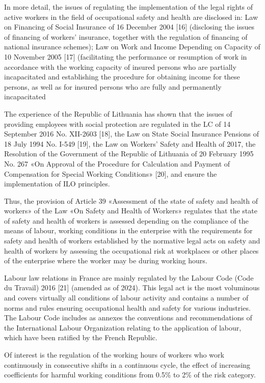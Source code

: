 In more detail, the issues of regulating the implementation of the legal
rights of active workers in the field of occupational safety and health
are disclosed in: Law on Financing of Social Insurance of 16 December
2004 {[}16{]} (disclosing the issues of financing of
workers'{} insurance, together with the regulation of
financing of national insurance schemes); Law on Work and Income
Depending on Capacity of 10 November 2005 {[}17{]} (facilitating the
performance or resumption of work in accordance with the working
capacity of insured persons who are partially incapacitated and
establishing the procedure for obtaining income for these persons, as
well as for insured persons who are fully and permanently incapacitated

The experience of the Republic of Lithuania has shown that the issues of
providing employees with social protection are regulated in the LC of 14
September 2016 No. XII-2603 {[}18{]}, the Law on State Social Insurance
Pensions of 18 July 1994 No. I-549 {[}19{]}, the Law on
Workers'{} Safety and Health of 2017, the Resolution of
the Government of the Republic of Lithuania of 20 February 1995 No. 267
«On Approval of the Procedure for Calculation and Payment of
Compensation for Special Working Conditions» {[}20{]}, and ensure the
implementation of ILO principles.

Thus, the provision of Article 39 «Assessment of the state of safety and
health of workers» of the Law «On Safety and Health of Workers»
regulates that the state of safety and health of workers is assessed
depending on the compliance of the means of labour, working conditions
in the enterprise with the requirements for safety and health of workers
established by the normative legal acts on safety and health of workers
by assessing the occupational risk at workplaces or other places of the
enterprise where the worker may be during working hours.

Labour law relations in France are mainly regulated by the Labour Code
(Code du Travail) 2016 {[}21{]} (amended as of 2024). This legal act is
the most voluminous and covers virtually all conditions of labour
activity and contains a number of norms and rules ensuring occupational
health and safety for various industries. The Labour Code includes as
annexes the conventions and recommendations of the International Labour
Organization relating to the application of labour, which have been
ratified by the French Republic.

Of interest is the regulation of the working hours of workers who work
continuously in consecutive shifts in a continuous cycle, the effect of
increasing coefficients for harmful working conditions from 0.5\% to 2\%
of the risk category.

